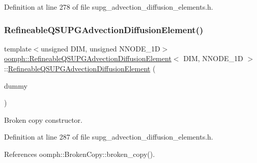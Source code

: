 Definition at line 278 of file supg\+\_\+advection\+\_\+diffusion\+\_\+elements.\+h.

\mbox{\label{classoomph_1_1RefineableQSUPGAdvectionDiffusionElement_ab1a671b5e856264a05cd4b46aee97da6}} 
\subsubsection{\texorpdfstring{Refineable\+Q\+S\+U\+P\+G\+Advection\+Diffusion\+Element()}{RefineableQSUPGAdvectionDiffusionElement()}\hspace{0.1cm}{\footnotesize\ttfamily [2/2]}}
{\footnotesize\ttfamily template$<$unsigned D\+IM, unsigned N\+N\+O\+D\+E\+\_\+1D$>$ \\
\hyperlink{classoomph_1_1RefineableQSUPGAdvectionDiffusionElement}{oomph\+::\+Refineable\+Q\+S\+U\+P\+G\+Advection\+Diffusion\+Element}$<$ D\+IM, N\+N\+O\+D\+E\+\_\+1D $>$\+::\hyperlink{classoomph_1_1RefineableQSUPGAdvectionDiffusionElement}{Refineable\+Q\+S\+U\+P\+G\+Advection\+Diffusion\+Element} (\begin{DoxyParamCaption}\item[{const \hyperlink{classoomph_1_1RefineableQSUPGAdvectionDiffusionElement}{Refineable\+Q\+S\+U\+P\+G\+Advection\+Diffusion\+Element}$<$ D\+IM, N\+N\+O\+D\+E\+\_\+1D $>$ \&}]{dummy }\end{DoxyParamCaption})\hspace{0.3cm}{\ttfamily [inline]}}



Broken copy constructor. 



Definition at line 287 of file supg\+\_\+advection\+\_\+diffusion\+\_\+elements.\+h.



References oomph\+::\+Broken\+Copy\+::broken\+\_\+copy().



